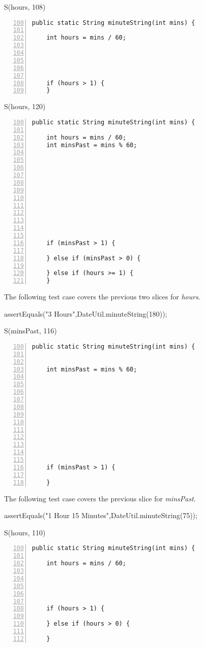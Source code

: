 \documentclass[fontsize=12pt,paper=letter,twoside]{scrartcl}
\begin{document}
\break
S(hours, 108)
\begin{lstlisting}[numbers=left,firstnumber=100]
  public static String minuteString(int mins) {
    
    int hours = mins / 60;
    
    


    
    if (hours > 1) {
    }
\end{lstlisting}


S(hours, 120)
\begin{lstlisting}[numbers=left,firstnumber=100]
  public static String minuteString(int mins) {
    
    int hours = mins / 60;
    int minsPast = mins % 60;
    
    
    
    
    
     
    
     
    
     
    

    if (minsPast > 1) {
      
    } else if (minsPast > 0) {
      
    } else if (hours >= 1) {
    }
\end{lstlisting}
The following test case covers the previous two slices for \emph{hours}.
\begin{code}
assertEquals("3 Hours",DateUtil.minuteString(180));
\end{code}
S(minsPast, 116)
\begin{lstlisting}[numbers=left,firstnumber=100]
  public static String minuteString(int mins) {
    
    
    int minsPast = mins % 60;
    
    
    
    
    
     
    
     
    
     
    

    if (minsPast > 1) {
      
    }
\end{lstlisting}
The following test case covers the previous slice for \emph{minsPast}.
\begin{code}
assertEquals("1 Hour 15 Minutes",DateUtil.minuteString(75));
\end{code}
S(hours, 110)
\begin{lstlisting}[numbers=left,firstnumber=100]
  public static String minuteString(int mins) {
    
    int hours = mins / 60;
    
    
    
    
    
    if (hours > 1) {
      
    } else if (hours > 0) {
    
    }
\end{lstlisting}
\end{document}
